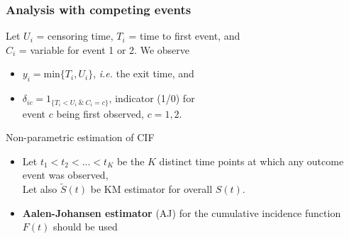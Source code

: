 \documentclass[handout,12pt,dvipsnames,t]{beamer}
\begin{document}
\begin{frame}[fragile]
\frametitle{Analysis with competing events}

Let $U_i$ = censoring time, 
$T_i$ = time to first event, and \\
$C_i$ = variable for event 1 or 2. %
We observe 
\begin{itemize}
\item $y_i = \text{min}\{ T_i, U_i \}$, \textit{i.e.}
the exit time, and
\item
 $ \delta_{ic} = 1_{ \{ T_i < U_i \ \& \ C_i = c\} }$, 
  indicator (1/0) for \\ 
  event $c$ being first observed, $c=1,2$. 
\end{itemize}


Non-parametric estimation %
of CIF

\begin{itemize}
\item
Let $t_1 < t_2 < \dots < t_K$ be the $K$ distinct 
time points at which any outcome event was observed, \\ Let also
 $\widetilde{S}(t)$ be KM estimator for overall $S(t)$. 
\medskip
\item
\textbf{Aalen-Johansen estimator} (AJ) for the cumulative incidence function $F(t)$
should be used 
\end{itemize}

\end{frame}
\end{document}
